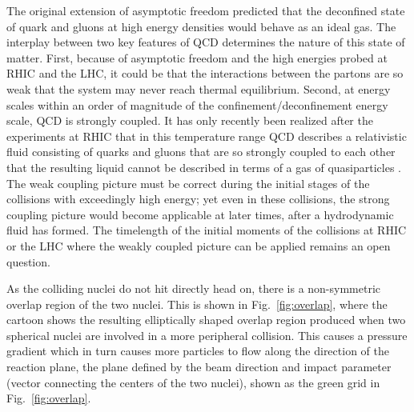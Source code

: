 The original extension of asymptotic freedom predicted that the deconfined state of quark and gluons at high energy densities would behave as an ideal gas. The interplay between two key features of QCD determines the nature of this state of matter. First, because of asymptotic freedom and the high energies probed at RHIC and the LHC, it could be that the interactions between the partons are so weak that the system may never reach thermal equilibrium. Second, at energy scales within an order of magnitude of the confinement/deconfinement energy scale, QCD is strongly coupled. It has only recently been realized after the experiments at RHIC that in this temperature range QCD describes a relativistic fluid consisting of quarks and gluons that are so strongly coupled to each other that the resulting liquid cannot be described in terms of a gas of quasiparticles \cite{Adams2005a}. The weak coupling picture must be correct during the initial stages of the collisions with exceedingly high energy; yet even in these collisions, the strong coupling picture would become applicable at later times, after a hydrodynamic fluid has formed. The timelength of the initial moments of the collisions at RHIC or the LHC where the weakly coupled picture can be applied remains an open question.


As the colliding nuclei do not hit directly head on, there is a non-symmetric overlap region of the two nuclei. This is shown in Fig.~\ref{fig:overlap}, where the cartoon shows the resulting elliptically shaped overlap region produced when two spherical nuclei are involved in a more peripheral collision. This causes a pressure gradient which in turn causes more particles to flow along the direction of the reaction plane, the plane defined by the beam direction and impact parameter (vector connecting the centers of the two nuclei), shown as the green grid in Fig.~\ref{fig:overlap}.

